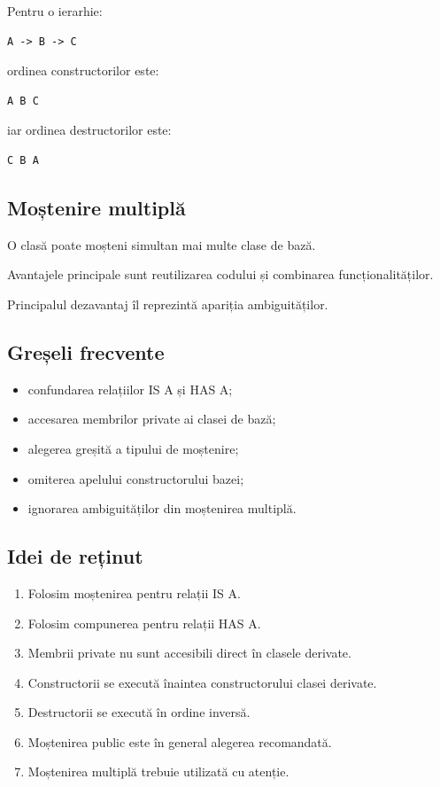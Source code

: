\documentclass[12pt,a4paper]{article}
\begin{document}
Pentru o ierarhie:

\begin{verbatim}
A -> B -> C
\end{verbatim}

ordinea constructorilor este:

\begin{verbatim}
A B C
\end{verbatim}

iar ordinea destructorilor este:

\begin{verbatim}
C B A
\end{verbatim}

\subsection{Moștenire multiplă}

O clasă poate moșteni simultan mai multe clase de bază.

Avantajele principale sunt reutilizarea codului și combinarea funcționalităților.

Principalul dezavantaj îl reprezintă apariția ambiguităților.

\subsection{Greșeli frecvente}

\begin{itemize}
\item confundarea relațiilor IS A și HAS A;
\item accesarea membrilor private ai clasei de bază;
\item alegerea greșită a tipului de moștenire;
\item omiterea apelului constructorului bazei;
\item ignorarea ambiguităților din moștenirea multiplă.
\end{itemize}

\subsection{Idei de reținut}

\begin{enumerate}
\item Folosim moștenirea pentru relații IS A.
\item Folosim compunerea pentru relații HAS A.
\item Membrii private nu sunt accesibili direct în clasele derivate.
\item Constructorii se execută înaintea constructorului clasei derivate.
\item Destructorii se execută în ordine inversă.
\item Moștenirea public este în general alegerea recomandată.
\item Moștenirea multiplă trebuie utilizată cu atenție.
\end{enumerate}
\end{document}
